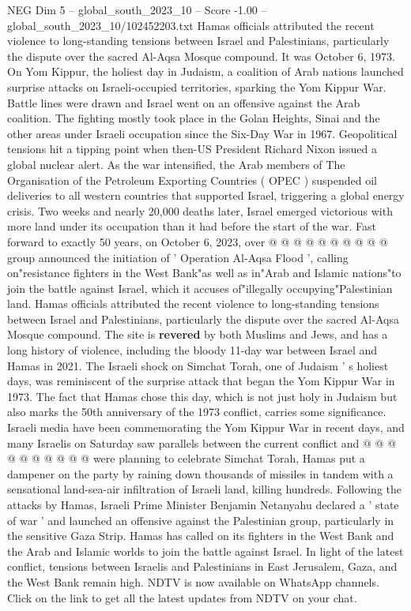 \begin{textsample}{NEG Dim 5 – global\_south\_2023\_10 – Score -1.00 – global\_south\_2023\_10/102452203.txt}  \label{ex:f5_neg_097}
Hamas officials attributed the recent violence to long-standing tensions between Israel and Palestinians, particularly the dispute over the sacred Al-Aqsa Mosque compound.
It was October 6, 1973.
On Yom Kippur, the holiest day in Judaism, a coalition of Arab nations launched surprise attacks on Israeli-occupied territories, sparking the Yom Kippur War.
Battle lines were drawn and Israel went on an offensive against the Arab coalition.
The fighting mostly took place in the Golan Heights, Sinai and the other areas under Israeli occupation since the Six-Day War in 1967.
Geopolitical tensions hit a tipping point when then-US President Richard Nixon issued a global nuclear alert.
As the war intensified, the Arab members of The Organisation of the Petroleum Exporting Countries ( OPEC ) suspended oil deliveries to all western countries that supported Israel, triggering a global energy crisis.
Two weeks and nearly 20,000 deaths later, Israel emerged victorious with more land under its occupation than it had before the start of the war.
Fast forward to exactly 50 years, on October 6, 2023, over @ @ @ @ @ @ @ @ @ @ group announced the initiation of ' Operation Al-Aqsa Flood ', calling on"resistance fighters in the West Bank"as well as in"Arab and Islamic nations"to join the battle against Israel, which it accuses of"illegally occupying"Palestinian land.
Hamas officials attributed the recent violence to long-standing tensions between Israel and Palestinians, particularly the dispute over the sacred Al-Aqsa Mosque compound.
The site is \textbf{revered} by both Muslims and Jews, and has a long history of violence, including the bloody 11-day war between Israel and Hamas in 2021.
The Israeli shock on Simchat Torah, one of Judaism ' s holiest days, was reminiscent of the surprise attack that began the Yom Kippur War in 1973.
The fact that Hamas chose this day, which is not just holy in Judaism but also marks the 50th anniversary of the 1973 conflict, carries some significance.
Israeli media have been commemorating the Yom Kippur War in recent days, and many Israelis on Saturday saw parallels between the current conflict and @ @ @ @ @ @ @ @ @ @ were planning to celebrate Simchat Torah, Hamas put a dampener on the party by raining down thousands of missiles in tandem with a sensational land-sea-air infiltration of Israeli land, killing hundreds.
Following the attacks by Hamas, Israeli Prime Minister Benjamin Netanyahu declared a ' state of war ' and launched an offensive against the Palestinian group, particularly in the sensitive Gaza Strip.
Hamas has called on its fighters in the West Bank and the Arab and Islamic worlds to join the battle against Israel.
In light of the latest conflict, tensions between Israelis and Palestinians in East Jerusalem, Gaza, and the West Bank remain high.
NDTV is now available on WhatsApp channels.
Click on the link to get all the latest updates from NDTV on your chat.

\end{textsample}
